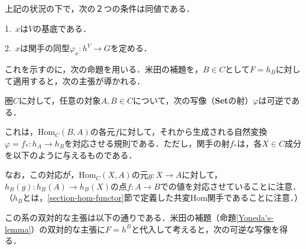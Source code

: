 \documentclass[uplatex, 12pt, dvipdfmx]{jsreport}
\begin{document}
\begin{proposition}[線型空間の基底の圏論的特徴付け]\rm{}\label{prop-charactorization-base}
    上記の状況の下で，次の２つの条件は同値である．

    1.\, $x$は$V$の基底である．

    2.\, $x$は関手の同型$\varphi_x :h^V\to G$を定める．
\end{proposition}
これを示すのに，次の命題を用いる．米田の補題を，$B\in C$として$F=h_B$に対して適用すると，次の主張が導かれる．
\begin{shadebox}\begin{corollary} \label{Yoneda's-lemma-1}\rm{}
    圏$C$に対して，任意の対象$A,B\in C$について，次の写像（\textbf{Set}の射）$\varphi$は可逆である．
    \begin{center}\end{center}
    これは，$\mathrm{Hom}_C(B,A) $の各元$f$に対して，それから生成される自然変換$\varphi=f_*:h_A\to h_B$を対応させる規則である．ただし，関手の射$f_*$は，各$X\in C$成分を以下のように与えるものである．
    \begin{center}\end{center}
    なお，この対応が，$\mathrm{Hom}_C(X,A)$の元$g:X\to A$に対して，$h_B(g):h_B(A)\to h_B(X)$の点$f:A\to B$での値を対応させていることに注意．（$h_B$とは，\ref{section-hom-functor}節で定義した共変Hom関手であることに注意．）
\end{corollary}\end{shadebox}
\begin{remark}\rm{}
    この系の双対的な主張は以下の通りである．米田の補題（命題\ref{Yoneda's-lemma}）の双対的な主張に$F=h^B$と代入して考えると，次の可逆な写像を得る．
    \begin{center}\end{center}
\end{remark}
\end{document}
